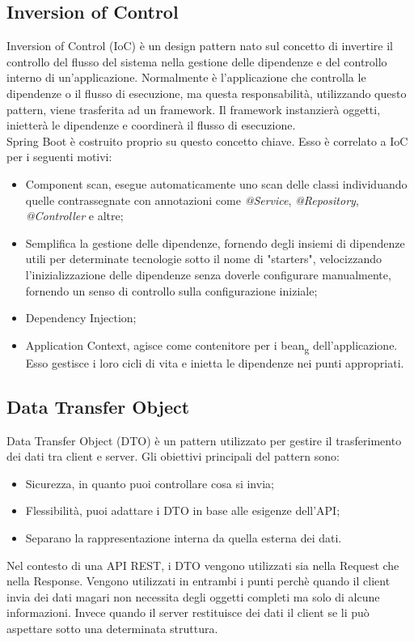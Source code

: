 \subsection*{Inversion of Control}
Inversion of Control (IoC) è un design pattern nato sul concetto di invertire il controllo del flusso del sistema nella gestione delle dipendenze e del controllo interno di un'applicazione. Normalmente è l'applicazione che controlla le dipendenze o il flusso di esecuzione, ma questa responsabilità, utilizzando questo pattern, viene trasferita ad un framework. Il framework instanzierà oggetti, inietterà le dipendenze e coordinerà il flusso di esecuzione.\\
Spring Boot è costruito proprio su questo concetto chiave. Esso è correlato a IoC per i seguenti motivi:
\begin{itemize}
\item Component scan, esegue automaticamente uno scan delle classi individuando quelle contrassegnate con annotazioni come \textit{@Service}, \textit{@Repository}, \textit{@Controller} e altre;
\item Semplifica la gestione delle dipendenze, fornendo degli insiemi di dipendenze utili per determinate tecnologie sotto il nome di "starters", velocizzando l'inizializzazione delle dipendenze senza doverle configurare manualmente, fornendo un senso di controllo sulla configurazione iniziale;
\item Dependency Injection;
\item Application Context, agisce come contenitore per i bean\textsubscript{g} dell'applicazione. Esso gestisce i loro cicli di vita e inietta le dipendenze nei punti appropriati.
\end{itemize}
\subsection*{Data Transfer Object}
Data Transfer Object (DTO) è un pattern utilizzato per gestire il trasferimento dei dati tra client e server. Gli obiettivi principali del pattern sono:
\begin{itemize}
\item Sicurezza, in quanto puoi controllare cosa si invia;
\item Flessibilità, puoi adattare i DTO in base alle esigenze dell'API;
\item Separano la rappresentazione interna da quella esterna dei dati.
\end{itemize}
Nel contesto di una API REST, i DTO vengono utilizzati sia nella Request che nella Response. Vengono utilizzati in entrambi i punti perchè quando il client invia dei dati magari non necessita degli oggetti completi ma solo di alcune informazioni. Invece quando il server restituisce dei dati il client se li può aspettare sotto una determinata struttura.\\
